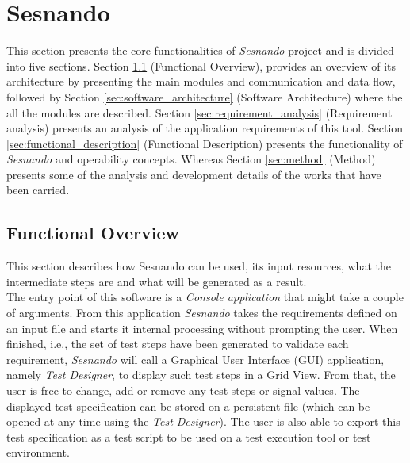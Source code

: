 \chapter{Sesnando}
\label{ch:sesnando}

This section presents the core functionalities of \textit{Sesnando} project and is divided into five sections. Section \ref{sec:functional_overview} (Functional Overview), provides an overview of its architecture by presenting the main modules and communication and data flow, followed by Section \ref{sec:software_architecture} (Software Architecture) where the all the modules are described. Section \ref{sec:requirement_analysis} (Requirement analysis) presents an analysis of the application requirements of this tool. Section \ref{sec:functional_description} (Functional Description) presents the functionality of \textit{Sesnando} and operability concepts. Whereas Section \ref{sec:method} (Method) presents some of the analysis and development details of the works that have been carried.


\section{Functional Overview}
\label{sec:functional_overview}

This section describes how Sesnando can be used, its input resources, what the intermediate steps are and what will be generated as a result.\\
The entry point of this software is a \textit{Console application} that might take a couple of arguments. From this application \textit{Sesnando} takes the requirements defined on an input file and starts it internal processing without prompting the user. When finished, i.e., the set of test steps have been generated to validate each requirement, \textit{Sesnando} will call a Graphical User Interface (GUI) application, namely \textit{Test Designer}, to display such test steps in a Grid View. From that, the user is free to change, add or remove any test steps or signal values. The displayed test specification can be stored on a persistent file (which can be opened at any time using the \textit{Test Designer}). The user is also able to export this test specification as a test script to be used on a test execution tool or test environment.\\

